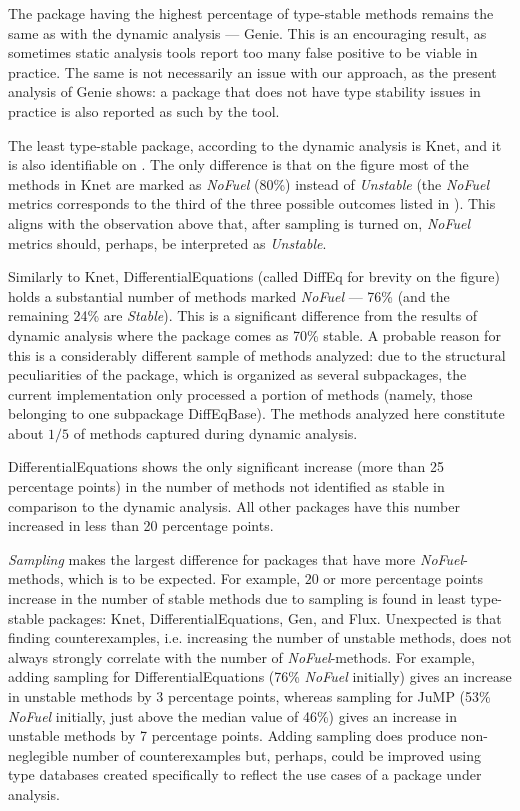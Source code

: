 The package having the highest percentage of type-stable methods remains the same as
with the dynamic analysis --- Genie.
This is an encouraging result, as sometimes static
analysis tools report too many false positive to be viable in practice.
The same is not necessarily an issue with our approach, as
the present analysis of Genie shows: a package that does not have type stability
issues in practice is also reported as such by the tool.

The least type-stable package, according to the dynamic analysis is Knet, and it
is also identifiable on . The only difference is that
on the figure most of the methods in Knet are marked as \emph{NoFuel} (80\%)
instead of \emph{Unstable} (the \emph{NoFuel} metrics corresponds to the third
of the three possible outcomes listed in ). This
aligns with the observation above that, after sampling is turned on,
\emph{NoFuel} metrics should, perhaps, be interpreted as \emph{Unstable}.

Similarly to Knet,
DifferentialEquations (called DiffEq for brevity on the figure)
holds a substantial number of methods marked \emph{NoFuel}
--- 76\% (and the remaining 24\% are
\emph{Stable}).
This is a significant difference from the results of dynamic
analysis where the package comes as 70\% stable. A probable reason for this is a
considerably different sample of methods analyzed: due to the structural
peculiarities of the package, which is organized as several subpackages, the current
implementation only processed a portion of methods (namely, those belonging to
one subpackage DiffEqBase). The methods analyzed here constitute about $1/5$ of
methods captured during dynamic analysis.

DifferentialEquations shows the only significant increase (more than 25
percentage points) in the number of
methods not identified as stable in comparison to the dynamic analysis.
All other packages have this number increased in less
than 20 percentage points.

\emph{Sampling} makes the largest difference for packages that have more
\emph{NoFuel}-methods, which is to be expected. For example, $20$ or more
percentage points increase in the number of stable methods due to sampling is
found in least type-stable packages: Knet, DifferentialEquations, Gen, and Flux.
Unexpected is that finding counterexamples, i.e. increasing
the number of unstable methods, does not always strongly correlate with the
number of \emph{NoFuel}-methods. For example, adding sampling for DifferentialEquations
(76\% \emph{NoFuel} initially) gives an increase in unstable methods by 3 percentage
points, whereas sampling for JuMP (53\% \emph{NoFuel} initially, just above the median value
of 46\%) gives an increase in unstable methods by 7 percentage points. Adding
sampling does produce non-neglegible number of counterexamples but, perhaps, could
be improved using type databases created specifically to reflect the use cases
of a package under analysis.
